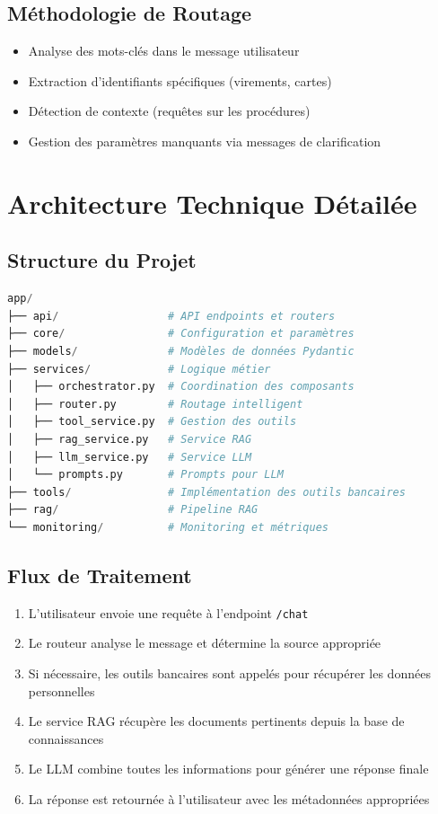 \documentclass[12pt,a4paper]{article}
\begin{document}
\subsection*{Méthodologie de Routage}
\begin{itemize}
    \item Analyse des mots-clés dans le message utilisateur
    \item Extraction d'identifiants spécifiques (virements, cartes)
    \item Détection de contexte (requêtes sur les procédures)
    \item Gestion des paramètres manquants via messages de clarification
\end{itemize}

\section*{Architecture Technique Détailée}

\subsection*{Structure du Projet}
\begin{lstlisting}[language=Python, caption={Structure principale du projet}]
app/
├── api/                 # API endpoints et routers
├── core/                # Configuration et paramètres
├── models/              # Modèles de données Pydantic
├── services/            # Logique métier
│   ├── orchestrator.py  # Coordination des composants
│   ├── router.py        # Routage intelligent
│   ├── tool_service.py  # Gestion des outils
│   ├── rag_service.py   # Service RAG
│   ├── llm_service.py   # Service LLM
│   └── prompts.py       # Prompts pour LLM
├── tools/               # Implémentation des outils bancaires
├── rag/                 # Pipeline RAG
└── monitoring/          # Monitoring et métriques
\end{lstlisting}

\subsection*{Flux de Traitement}
\begin{enumerate}
    \item L'utilisateur envoie une requête à l'endpoint \texttt{/chat}
    \item Le routeur analyse le message et détermine la source appropriée
    \item Si nécessaire, les outils bancaires sont appelés pour récupérer les données personnelles
    \item Le service RAG récupère les documents pertinents depuis la base de connaissances
    \item Le LLM combine toutes les informations pour générer une réponse finale
    \item La réponse est retournée à l'utilisateur avec les métadonnées appropriées
\end{enumerate}
\end{document}

